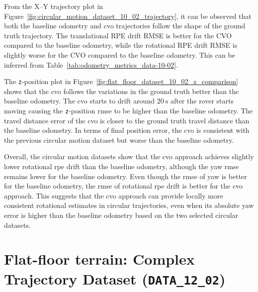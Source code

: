 \documentclass[report.tex]{subfiles}
\begin{document}


    From the X--Y trajectory plot in Figure~\ref{fig:circular_motion_dataset_10_02_trajectory}, it can be observed that both the baseline odometry and \gls{cvo} trajectories follow the shape of the ground truth trajectory. The translational RPE drift RMSE is better for the CVO compared to the baseline odometry, while the rotational RPE drift RMSE is slightly worse for the CVO compared to the baseline odometry. This can be inferred from Table~\ref{tab:odometry_metrics_data-10-02}.
    
    The \texttt{z}-position plot in Figure~\ref{fig:flat_floor_dataset_10_02_z_comparison} shows that the \gls{cvo} follows the variations in the ground truth better than the baseline odometry. The \gls{cvo} starts to drift around $20~\mathrm{s}$ after the rover starts moving causing the \texttt{z}-position \gls{rmse} to be higher than the baseline odometry. The travel distance error of the \gls{cvo} is closer to the ground truth travel distance than the baseline odometry. In terms of final position error, the \gls{cvo} is consistent with the previous circular motion dataset but worse than the baseline odometry. 

    Overall, the circular motion datasets show that the \gls{cvo} approach achieves slightly lower rotational \gls{rpe} drift than the baseline odometry, although the yaw \gls{rmse} remains lower for the baseline odometry. Even though the \gls{rmse} of yaw is better for the baseline odometry, the \gls{rmse} of rotational \gls{rpe} drift is better for the \gls{cvo} approach. This suggests that the \gls{cvo} approach can provide locally more consistent rotational estimates in circular trajectories, even when its absolute yaw error is higher than the baseline odometry based on the two selected circular datasets.
    \FloatBarrier
      
    \section{Flat-floor terrain: Complex Trajectory Dataset (\texttt{DATA\_12\_02})} \label{subsubsec:complexTrajectoryD3_12_02}
\end{document}
